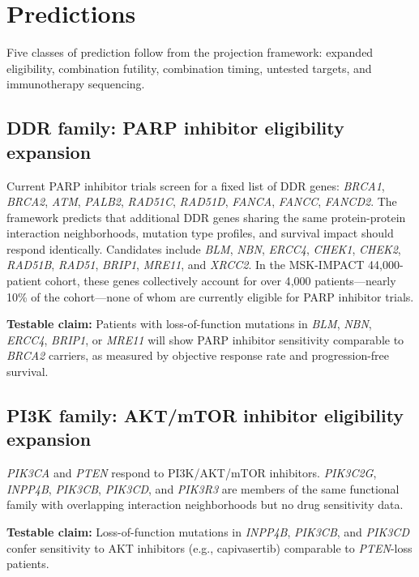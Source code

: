 \documentclass[11pt]{article}
\begin{document}
\section{Predictions}
\label{sec:predictions}

Five classes of prediction follow from the projection framework:
expanded eligibility, combination futility, combination timing,
untested targets, and immunotherapy sequencing.

\subsection{DDR family: PARP inhibitor eligibility expansion}

Current PARP inhibitor trials screen for a fixed list of DDR genes:
\emph{BRCA1}, \emph{BRCA2}, \emph{ATM}, \emph{PALB2},
\emph{RAD51C}, \emph{RAD51D}, \emph{FANCA}, \emph{FANCC},
\emph{FANCD2}. The framework predicts that additional DDR genes
sharing the same protein-protein interaction neighborhoods, mutation
type profiles, and survival impact should respond identically.
Candidates include \emph{BLM}, \emph{NBN}, \emph{ERCC4},
\emph{CHEK1}, \emph{CHEK2}, \emph{RAD51B}, \emph{RAD51},
\emph{BRIP1}, \emph{MRE11}, and \emph{XRCC2}. In the MSK-IMPACT
44{,}000-patient cohort, these genes collectively account for over
4{,}000 patients---nearly 10\% of the cohort---none of whom are
currently eligible for PARP inhibitor trials.

\textbf{Testable claim:} Patients with loss-of-function mutations in
\emph{BLM}, \emph{NBN}, \emph{ERCC4}, \emph{BRIP1}, or \emph{MRE11}
will show PARP inhibitor sensitivity comparable to \emph{BRCA2}
carriers, as measured by objective response rate and
progression-free survival.

\subsection{PI3K family: AKT/mTOR inhibitor eligibility expansion}

\emph{PIK3CA} and \emph{PTEN} respond to PI3K/AKT/mTOR inhibitors.
\emph{PIK3C2G}, \emph{INPP4B}, \emph{PIK3CB}, \emph{PIK3CD}, and
\emph{PIK3R3} are members of the same functional family with
overlapping interaction neighborhoods but no drug sensitivity data.

\textbf{Testable claim:} Loss-of-function mutations in
\emph{INPP4B}, \emph{PIK3CB}, and \emph{PIK3CD} confer sensitivity
to AKT inhibitors (e.g., capivasertib) comparable to
\emph{PTEN}-loss patients.
\end{document}
